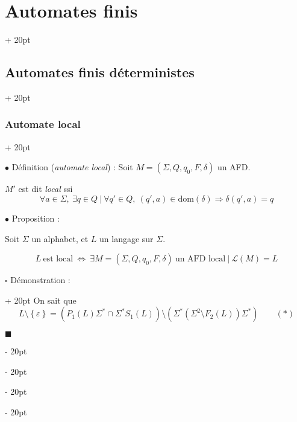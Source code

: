 \documentclass[a4paper, 12pt, twoside]{article}
\newcommand{\lr}[1]{\left( #1 \right)}
\newcommand{\set}[1]{\left\{ #1 \right\}}
\newcommand{\ssi}{\ \Leftrightarrow \ }
\newcommand{\ind}[1][20pt]{\advance\leftskip + #1}
\newcommand{\deind}[1][20pt]{\advance\leftskip - #1}
\newenvironment{indt}[2][20pt]{#2 \par \ind[#1]}{\par \deind} %
\newenvironment{proof}[1][{Démonstration :}]{\begin{indt}{$\square$ #1}}{$\blacksquare$ \end{indt}}
\begin{document}
\begin{indt}{\section{Automates finis}}
\begin{indt}{\subsection{Automates finis déterministes}}
\begin{indt}{\subsubsection{Automate local}}
\begin{center}
                \end{center}

                \vspace{12pt}
                
                $\bullet$ Définition (\emph{automate local}) : Soit $M = (\Sigma, Q, q_0, F, \delta)$ un AFD.

                $M'$ est dit \emph{local} ssi
                \[
                    \forall a \in \Sigma,\ \exists q \in Q\ |\ \forall q' \in Q,\
                    (q', a) \in \mathrm{dom}(\delta) \Rightarrow \delta(q', a) = q
                \]

                \vspace{12pt}
                
                $\bullet$ Proposition :
                \begin{emphBox}
                    Soit $\Sigma$ un alphabet, et $L$ un langage sur $\Sigma$.

                    \[
                        L\ \text{est local}
                        \ssi
                        \exists M = (\Sigma, Q, q_0, F, \delta)\ \text{un AFD local}\ |\
                        \mathcal L(M) = L
                    \]
                \end{emphBox}

                \vspace{6pt}
                
                \begin{proof}
                    \boxed{\Rightarrow} On sait que
                    \[
                        L \setminus \set \varepsilon = \lr{P_1(L) \Sigma^* \cap \Sigma^*S_1(L)} \setminus \lr{\Sigma^*\lr{\Sigma^2 \setminus F_2(L)} \Sigma^*}
                        \qquad (*)
                \]


\end{proof}
\end{indt}
\end{indt}
\end{indt}
\end{document}
